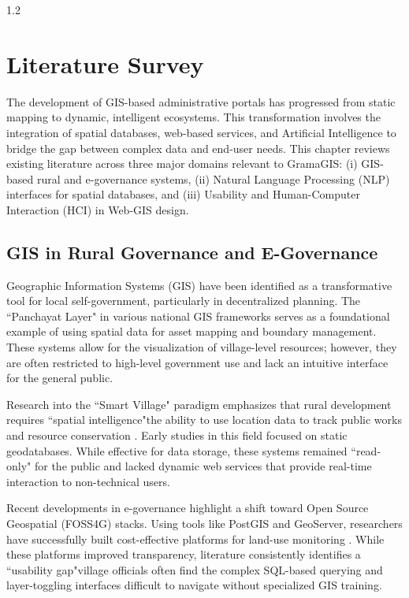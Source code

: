 \newpage
\thispagestyle{empty}
%
\begin{spacing}{1.2}
\chapter{Literature Survey}

The development of GIS-based administrative portals has progressed from static mapping to dynamic, intelligent ecosystems. This transformation involves the integration of spatial databases, web-based services, and Artificial Intelligence to bridge the gap between complex data and end-user needs. This chapter reviews existing literature across three major domains relevant to GramaGIS: (i) GIS-based rural and e-governance systems, (ii) Natural Language Processing (NLP) interfaces for spatial databases, and (iii) Usability and Human-Computer Interaction (HCI) in Web-GIS design.

\section{GIS in Rural Governance and E-Governance}

Geographic Information Systems (GIS) have been identified as a transformative tool for local self-government, particularly in decentralized planning. The ``Panchayat Layer" in various national GIS frameworks serves as a foundational example of using spatial data for asset mapping and boundary management. These systems allow for the visualization of village-level resources; however, they are often restricted to high-level government use and lack an intuitive interface for the general public.

Research into the ``Smart Village" paradigm emphasizes that rural development requires ``spatial intelligence"the ability to use location data to track public works and resource conservation \cite{smart_panchayat2023}. Early studies in this field focused on static geodatabases. While effective for data storage, these systems remained ``read-only" for the public and lacked dynamic web services that provide real-time interaction to non-technical users.

Recent developments in e-governance highlight a shift toward Open Source Geospatial (FOSS4G) stacks. Using tools like PostGIS and GeoServer, researchers have successfully built cost-effective platforms for land-use monitoring \cite{postgis_in_action}. While these platforms improved transparency, literature consistently identifies a ``usability gap"village officials often find the complex SQL-based querying and layer-toggling interfaces difficult to navigate without specialized GIS training.


\end{spacing}
